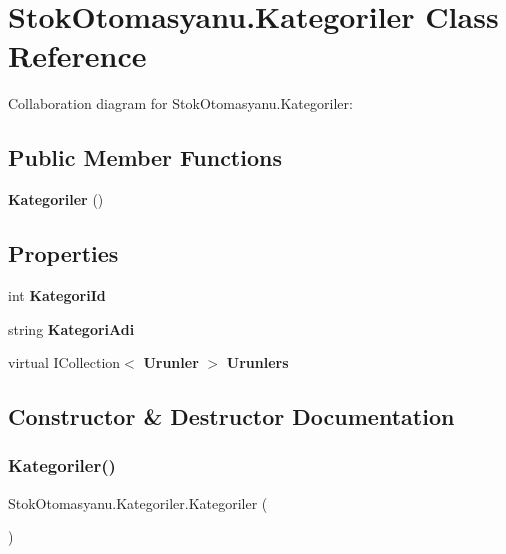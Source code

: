 \section{Stok\+Otomasyanu.\+Kategoriler Class Reference}
\label{class_stok_otomasyanu_1_1_kategoriler}


Collaboration diagram for Stok\+Otomasyanu.\+Kategoriler\+:
\subsection*{Public Member Functions}
\begin{DoxyCompactItemize}
\item 
\textbf{ Kategoriler} ()
\end{DoxyCompactItemize}
\subsection*{Properties}
\begin{DoxyCompactItemize}
\item 
int \textbf{ Kategori\+Id}\hspace{0.3cm}{\ttfamily  [get, set]}
\item 
string \textbf{ Kategori\+Adi}\hspace{0.3cm}{\ttfamily  [get, set]}
\item 
virtual I\+Collection$<$ \textbf{ Urunler} $>$ \textbf{ Urunlers}\hspace{0.3cm}{\ttfamily  [get, set]}
\end{DoxyCompactItemize}


\subsection{Constructor \& Destructor Documentation}
\mbox{\label{class_stok_otomasyanu_1_1_kategoriler_a6455af2bceca6eea9acb36159ea07c50}} 
\subsubsection{Kategoriler()}
{\footnotesize\ttfamily Stok\+Otomasyanu.\+Kategoriler.\+Kategoriler (\begin{DoxyParamCaption}{ }\end{DoxyParamCaption})}



